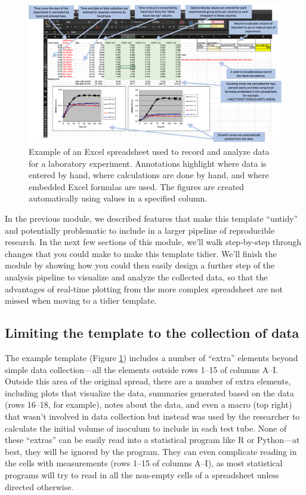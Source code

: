 \documentclass[]{tufte-book}
\begin{document}
\begin{figure}
\includegraphics[width=\textwidth]{figures/growth_curve_example} \caption[Example of an Excel spreadsheet used to record and analyze data for a laboratory experiment]{Example of an Excel spreadsheet used to record and analyze data for a laboratory experiment. Annotations highlight where data is entered by hand, where calculations are done by hand, and where embedded Excel formulas are used. The figures are created automatically using values in a specified column.}\label{fig:growthexcel2}
\end{figure}

In the previous module, we described features that make this template ``untidy''
and potentially problematic to include in a larger pipeline of reproducible
research. In the next few sections of this module, we'll walk step-by-step
through changes that you could make to make this template tidier. We'll finish
the module by showing how you could then easily design a further step of the
analysis pipeline to visualize and analyze the collected data, so that the
advantages of real-time plotting from the more complex spreadsheet are not
missed when moving to a tidier template.

\hypertarget{limiting-the-template-to-the-collection-of-data}{%
\subsection{Limiting the template to the collection of data}\label{limiting-the-template-to-the-collection-of-data}}

The example template (Figure \ref{fig:growthexcel2}) includes a number of
``extra'' elements beyond simple data collection---all the elements outside rows
1--15 of columns A--I. Outside this area of the original spread, there are a
number of extra elements, including plots that visualize the data, summaries
generated based on the data (rows 16--18, for example), notes about the data,
and even a macro (top right) that wasn't involved in data collection but instead
was used by the researcher to calculate the initial volume of inoculum to
include in each test tube. None of these ``extras'' can be easily read into a
statistical program like R or Python---at best, they will be ignored by the program.
They can even complicate reading in the cells with measurements (rows
1--15 of columns A--I), as most statistical programs will try to read in all the
non-empty cells of a spreadsheet unless directed otherwise.
\end{document}
